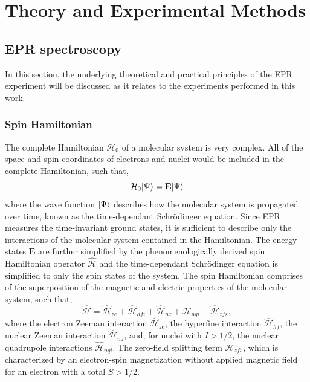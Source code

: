 \chapter[Theory and Experimental Methods]{Theory and Experimental Methods}
\section{EPR spectroscopy}
In this section, the underlying theoretical and practical principles of the EPR experiment will be discussed as it relates to the experiments performed in this work. 

\subsection{Spin Hamiltonian}
The complete Hamiltonian $\mathcal{H}_0$ of a molecular system is very complex. All of the space and spin coordinates of electrons and nuclei would be included in the complete Hamiltonian, such that,
\begin{equation}
    \mathcal{H}_0 \lvert\Psi\rangle = {\mathbf E} \lvert\Psi\rangle
\end{equation}
where the wave function $\lvert\Psi\rangle$ describes how the molecular system is propagated over time, known as the time-dependant Schr\"{o}dinger equation. Since EPR measures the time-invariant ground states, it is sufficient to describe only the interactions of the molecular system contained in the Hamiltonian. The energy states ${\mathbf E}$ are further simplified by the phenomenologically derived spin Hamiltonian operator $\hat{\mathcal{H}}$ and the time-dependant Schr\"{o}dinger equation is simplified to only the spin states of the system. \cite{SpinDyn,abragam1961} The spin Hamiltonian comprises of the superposition of the magnetic and electric properties of the molecular system, such that,
\begin{equation}
    \hat{\mathcal{H}} = \hat{\mathcal{H}}_{ze} + \hat{\mathcal{H}}_{hfi} + \hat{\mathcal{H}}_{nz} + \hat{\mathcal{H}}_{nqi} + \hat{\mathcal{H}}_{zfs},
\end{equation}
where the electron Zeeman interaction $\hat{\mathcal{H}}_{ze}$, the hyperfine interaction $\hat{\mathcal{H}}_{hf}$, the nuclear Zeeman interaction $\hat{\mathcal{H}}_{nz}$, and, for nuclei with $I > 1/2$, the nuclear quadrupole interactions $\hat{\mathcal{H}}_{nqi}$. The zero-field splitting term $ \hat{\mathcal{H}}_{zfs}$, which is characterized by an electron-spin magnetization without applied magnetic field for an electron with a total $S > 1/2$.

